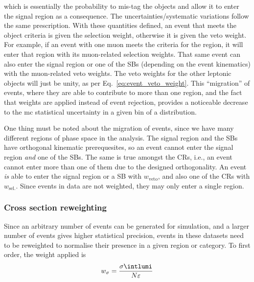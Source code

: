which is essentially the probability to mis-tag the objects and allow it to enter the signal region as a consequence. The uncertainties/systematic variations follow the same prescription. With these quantities defined, an event that meets the object criteria is given the selection weight, otherwise it is given the veto weight. For example, if an event with one muon meets the criteria for the \singleMuCr region, it will enter that region with its muon-related selection weights. That same event can also enter the signal region or one of the \glspl{SB} (depending on the event kinematics) with the muon-related veto weights. The veto weights for the other leptonic objects will just be unity, as per Eq.~\ref{eq:event_veto_weight}. This ``migration'' of events, where they are able to contribute to more than one region, and the fact that weights are applied instead of event rejection, provides a noticeable decrease to the \acrlong{mc} statistical uncertainty in a given bin of a distribution.

One thing must be noted about the migration of events, since we have many different regions of phase space in the analysis. The signal region and the \glspl{SB} have orthogonal kinematic prerequesites, so an event cannot enter the signal region \emph{and} one of the \glspl{SB}. The same is true amongst the \glspl{CR}, i.e., an event cannot enter more than one of them due to the designed orthogonality. An event \emph{is} able to enter the signal region or a \gls{SB} with $w_{\mathrm{veto}}$, and also one of the \glspl{CR} with $w_{\mathrm{sel.}}$. Since events in data are not weighted, they may only enter a single region.



\subsubsection{Cross section reweighting}
\label{subsubsec:xs_weighting}

Since an arbitrary number of events can be generated for simulation, and a larger number of events gives higher statistical precision, events in these datasets need to be reweighted to normalise their presence in a given region or category. To first order, the weight applied is
\begin{equation}
    w_{\sigma} = \frac{ \sigma \intlumi }{ N \varepsilon }
    \label{eq:xs_weight}
\end{equation}

